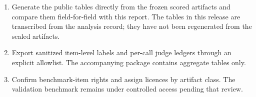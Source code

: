 \documentclass[9pt,letterpaper,twocolumn]{extarticle}
\providecommand{\tightlist}{\setlength{\itemsep}{0pt}\setlength{\parskip}{0pt}}
\begin{document}
\begin{enumerate}
\def\labelenumi{\arabic{enumi}.}
\tightlist
\item
  Generate the public tables directly from the frozen scored artifacts
  and compare them field-for-field with this report. The tables in this
  release are transcribed from the analysis record; they have not been
  regenerated from the sealed artifacts.
\item
  Export sanitized item-level labels and per-call judge ledgers through
  an explicit allowlist. The accompanying package contains aggregate
  tables only.
\item
  Confirm benchmark-item rights and assign licences by artifact class.
  The validation benchmark remains under controlled access pending that
  review.
\end{enumerate}
\end{document}
